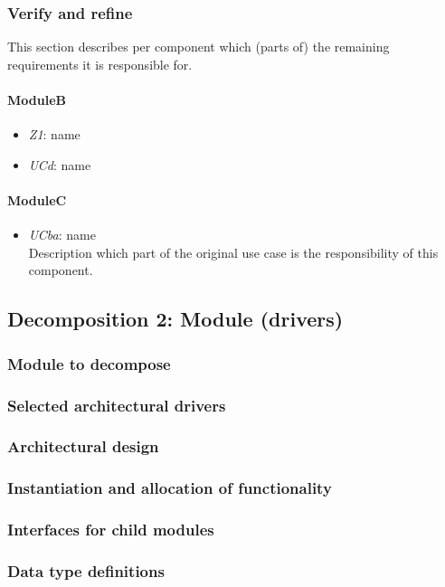 \documentclass[a4paper,10pt]{article}
\begin{document}
\subsubsection{Verify and refine}
This section describes per component which (parts of) the remaining
requirements it is responsible for.

\paragraph{ModuleB}
\begin{itemize}
    \item \emph{Z1}: name
    \item \emph{UCd}: name
\end{itemize}

\paragraph{ModuleC}
\begin{itemize}
    \item \emph{UCba}: name\\Description which part of the original use case is
        the responsibility of this component.
\end{itemize}

\subsection{Decomposition 2: Module (drivers)}
\subsubsection{Module to decompose}
\subsubsection{Selected architectural drivers}
\subsubsection{Architectural design}
\subsubsection{Instantiation and allocation of functionality}
\subsubsection{Interfaces for child modules}
\subsubsection{Data type definitions}
\end{document}

